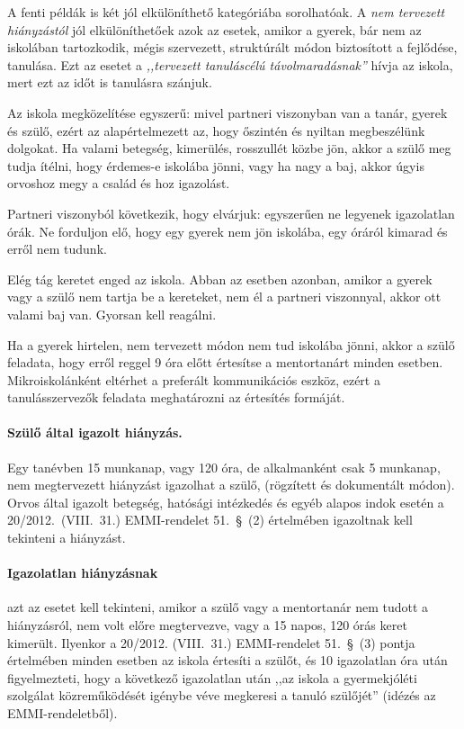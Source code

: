 \documentclass{article}
\begin{document}
A fenti példák is két jól elkülöníthető kategóriába sorolhatóak. A \emph{nem tervezett hiányzástól} jól elkülöníthetőek azok az esetek, amikor a gyerek, bár nem az iskolában tartozkodik, mégis szervezett, struktúrált módon biztosított a fejlődése, tanulása. Ezt az esetet a \emph{,,tervezett tanuláscélú távolmaradásnak''} hívja az iskola, mert ezt az időt is tanulásra szánjuk.


Az iskola megközelítése egyszerű: mivel partneri viszonyban van a tanár, gyerek és szülő, ezért az alapértelmezett az, hogy őszintén és nyiltan megbeszélünk dolgokat. Ha valami betegség, kimerülés, rosszullét közbe jön, akkor a szülő meg tudja ítélni, hogy érdemes-e iskolába jönni, vagy ha nagy a baj, akkor úgyis orvoshoz megy a család és hoz igazolást. 

Partneri viszonyból következik, hogy elvárjuk: egyszerűen ne legyenek igazolatlan órák. Ne forduljon elő, hogy egy gyerek nem jön iskolába, egy óráról kimarad és erről nem tudunk.

Elég tág keretet enged az iskola. Abban az esetben azonban, amikor a gyerek vagy a szülő nem tartja be a kereteket, nem él a partneri viszonnyal, akkor ott valami baj van. Gyorsan kell reagálni.

Ha a gyerek hirtelen, nem tervezett módon nem tud iskolába jönni, akkor a szülő feladata, hogy erről reggel 9 óra előtt értesítse a mentortanárt minden esetben. Mikroiskolánként eltérhet a preferált kommunikációs eszköz, ezért a tanulásszervezők feladata meghatározni az értesítés formáját.


\paragraph{Szülő által igazolt hiányzás.} Egy tanévben 15 munkanap, vagy 120 óra, de alkalmanként csak 5 munkanap, nem megtervezett hiányzást igazolhat a szülő, 
(rögzített és dokumentált módon). Orvos által igazolt betegség, hatósági intézkedés és egyéb alapos indok esetén a 20/2012.~(VIII.~31.) EMMI-rendelet 51.~§~(2) értelmében igazoltnak kell tekinteni a hiányzást.

\paragraph{Igazolatlan hiányzásnak} azt az esetet kell tekinteni, amikor a szülő vagy a mentortanár nem tudott a hiányzásról, nem volt előre megtervezve, vagy a 15 napos, 120 órás keret kimerült. Ilyenkor a 20/2012. (VIII.~31.) EMMI-rendelet 51.~§~(3) pontja értelmében minden esetben az iskola értesíti a szülőt, és 10 igazolatlan óra után figyelmezteti, hogy a következő igazolatlan után ,,az iskola a gyermekjóléti szolgálat közreműködését igénybe véve megkeresi a tanuló szülőjét'' (idézés az EMMI-rendeletből). 
\end{document}
